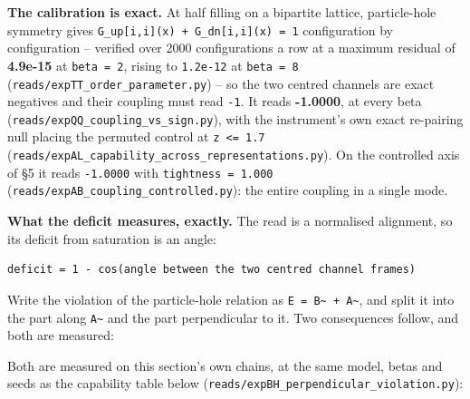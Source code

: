 \documentclass[10pt,letterpaper,twocolumn]{article}
\begin{document}
\textbf{The calibration is exact.} At half filling on a bipartite lattice, particle-hole symmetry gives
\texttt{G\_\allowbreak{}up[\allowbreak{}i,\allowbreak{}i]\allowbreak{}(\allowbreak{}x)\allowbreak{}\ +\allowbreak{}\ G\_\allowbreak{}dn[\allowbreak{}i,\allowbreak{}i]\allowbreak{}(\allowbreak{}x)\allowbreak{}\ =\allowbreak{}\ 1} configuration by configuration -- verified over 2000
configurations a row at a maximum residual of \textbf{4.9e-15} at \texttt{beta\ =\allowbreak{}\ 2}, rising to \texttt{1.\allowbreak{}2e-{}\allowbreak{}12} at
\texttt{beta\ =\allowbreak{}\ 8} (\texttt{reads/\allowbreak{}expTT\_\allowbreak{}order\_\allowbreak{}parameter.\allowbreak{}py}) -- so the two centred channels are exact
negatives and their coupling must read \texttt{-{}\allowbreak{}1}. It reads \textbf{-1.0000}, at every beta
(\texttt{reads/\allowbreak{}expQQ\_\allowbreak{}coupling\_\allowbreak{}vs\_\allowbreak{}sign.\allowbreak{}py}), with the instrument's own exact re-pairing null placing the
permuted control at \texttt{\textbar{}\allowbreak{}z\textbar{}\allowbreak{}\ \textless{}\allowbreak{}=\allowbreak{}\ 1.\allowbreak{}7} (\texttt{reads/\allowbreak{}expAL\_\allowbreak{}capability\_\allowbreak{}across\_\allowbreak{}representations.\allowbreak{}py}). On the
controlled axis of §5 it reads \texttt{-{}\allowbreak{}1.\allowbreak{}0000} with \texttt{tightness\ =\allowbreak{}\ 1.\allowbreak{}000}
(\texttt{reads/\allowbreak{}expAB\_\allowbreak{}coupling\_\allowbreak{}controlled.\allowbreak{}py}): the entire coupling in a single mode.

\textbf{What the deficit measures, exactly.} The read is a normalised alignment, so its deficit from
saturation is an angle:

\begin{verbatim}
deficit = 1 - cos(angle between the two centred channel frames)
\end{verbatim}

Write the violation of the particle-hole relation as \texttt{E\ =\allowbreak{}\ B\textasciitilde{}\ +\allowbreak{}\ A\textasciitilde{}}, and split it into the part
along \texttt{A\textasciitilde{}} and the part perpendicular to it. Two consequences follow, and both are measured:

Both are measured on this section's own chains, at the same model, betas and seeds as the
capability table below (\texttt{reads/\allowbreak{}expBH\_\allowbreak{}perpendicular\_\allowbreak{}violation.\allowbreak{}py}):
\end{document}
